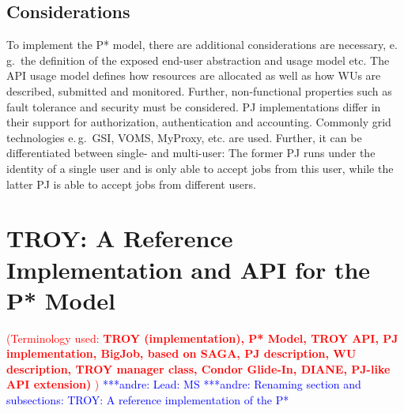 \documentclass[conference,final]{IEEEtran}
\newcommand{\terminology}[1]{ {\textcolor{red} {(Terminology used: \textbf{#1}) }}}
\newcommand{\jhanote}[1]{ {\textcolor{red} { ***shantenu: #1 }}}
\newcommand{\alnote}[1]{ {\textcolor{blue} { ***andre: #1 }}}
\newcommand{\terminology}[1]{}
\newcommand{\alnote}[1]{}
\newcommand{\jhanote}[1]{}
\newcommand{\upp}{\vspace*{-0.5em}}
\begin{document}
\upp
\subsection{Considerations\upp\upp}




To implement the P* model, there are additional considerations are necessary,
e.\,g.\ the definition of the exposed end-user abstraction and usage model etc.
The API usage model defines how resources are allocated as well as how WUs are
described, submitted and monitored. Further, non-functional properties such as
fault tolerance and security must be considered. PJ implementations differ in
their support for authorization, authentication and accounting. Commonly grid
technologies e.\,g.\ GSI, VOMS, MyProxy, etc. are used. Further, it can be
differentiated between single- and multi-user: The former PJ runs under the
identity of a single user and is only able to accept jobs from this user, while
the latter PJ is able to accept jobs from different users.



\section{TROY: A Reference Implementation and API for the P* Model\upp\upp}
\terminology{TROY (implementation), P* Model, TROY API, PJ implementation, BigJob, based on SAGA,
PJ description, WU description, TROY manager class, Condor Glide-In, DIANE, PJ-like API extension)
}
\alnote{Lead: MS}
\alnote{Renaming section and subsections: TROY: A reference implementation of the P*}
\end{document}
